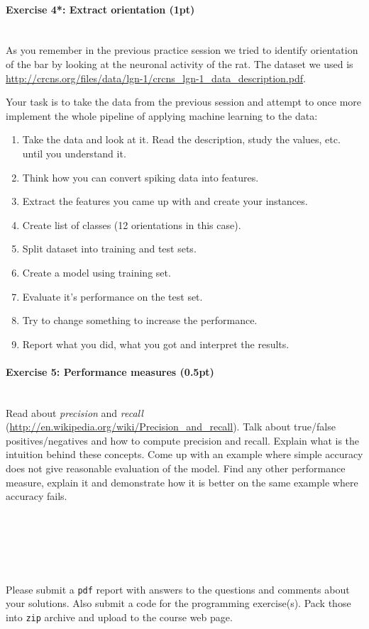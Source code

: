 \documentclass[a4paper,11pt]{article}
\newenvironment{exercise}[3]{\paragraph{Exercise #1: #2 (#3pt)}\ \\}{
\medskip}
\begin{document}
\begin{exercise}{4*}{Extract orientation}{1}
As you remember in the previous practice session we tried to identify orientation of the bar by looking at the neuronal activity of the rat. The dataset we used is \url{http://crcns.org/files/data/lgn-1/crcns_lgn-1_data_description.pdf}.

Your task is to take the data from the previous session and attempt to once more implement the whole pipeline of applying machine learning to the data:
\begin{enumerate}
\itemsep 0em
	\item Take the data and look at it. Read the description, study the values, etc. until you understand it.
	\item Think how you can convert spiking data into features.
	\item Extract the features you came up with and create your instances.
	\item Create list of classes (12 orientations in this case).
	\item Split dataset into training and test sets.
	\item Create a model using training set.
	\item Evaluate it's performance on the test set.
	\item Try to change something to increase the performance.
	\item Report what you did, what you got and interpret the results.
\end{enumerate}
\end{exercise}


\begin{exercise}{5}{Performance measures}{0.5}
Read about \emph{precision} and \emph{recall} (\url{http://en.wikipedia.org/wiki/Precision_and_recall}). Talk about true/false positives/negatives and how to compute precision and recall. Explain what is the intuition behind these concepts. Come up with an example where simple accuracy does not give reasonable evaluation of the model. Find any other performance measure, explain it and demonstrate how it is better on the same example where accuracy fails.
\end{exercise}
\ \\
\ \\
\ \\
\ \\
\ \\
Please submit a \texttt{pdf} report with answers to the questions and comments about your solutions. Also submit a code for the programming exercise(s). Pack those into \texttt{zip} archive and upload to the course web page.
\end{document}
